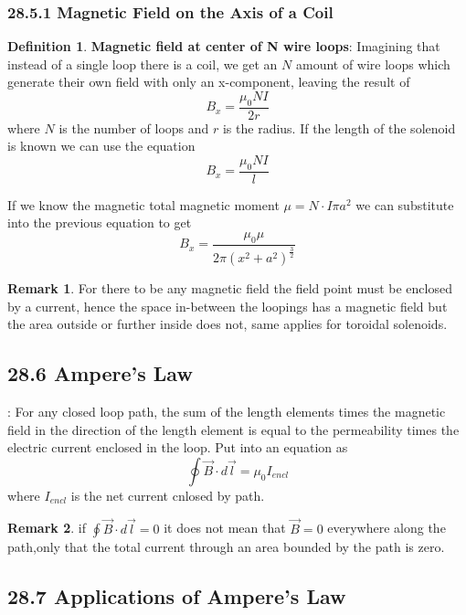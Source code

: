\documentclass[12pt]{amsart}
\theoremstyle{definition}
\newtheorem{definition}{Definition} %
\newtheorem*{remark}{Remark}        %
\numberwithin{equation}{theorem}    %
\begin{document}
\subsubsection*{28.5.1 Magnetic Field on the Axis of a Coil}

\begin{definition}
    \textbf{Magnetic field at center of N wire loops}:
    Imagining that instead of a single loop there is a coil, we get an $N$ amount of wire loops which generate their own field with only an x-component, leaving the result of $$B_x = \frac{\mu_0NI}{2r}$$
    where $N$ is the number of loops and $r$ is the radius. 
    If the length of the solenoid is known we can use the equation
    $$B_x =\frac{\mu_0NI}{l}$$
    
    If we know the magnetic total magnetic moment $\mu = N\cdot I\pi a^2$ we can substitute into the previous equation to get 
    $$B_x = \frac{\mu_0 \mu}{2\pi(x^2+a^2)^{\frac{3}{2}}} $$

    \begin{remark}
        For there to be any magnetic field the field point must be enclosed by a current, hence the space in-between the loopings has a magnetic field but the area outside or further inside does not, same applies for toroidal solenoids.
    \end{remark}
\end{definition}

\subsection*{28.6 Ampere's Law}:
For any closed loop path, the sum of the length elements times the magnetic field in the direction of the length element is equal to the permeability times the electric current enclosed in the loop. Put into an equation as 
$$\oint\vec{B} \cdot d\vec{l} = \mu_0I_{encl}$$ where $I_{encl}$ is the net current cnlosed by path.

\begin{remark}
    if $\oint\vec{B} \cdot d\vec{l} = 0$ it does not mean that $\vec{B} = 0$  everywhere along the path,only that the total current through an area bounded by the path is zero.
\end{remark}

\subsection*{28.7 Applications of Ampere's Law}
\end{document}
